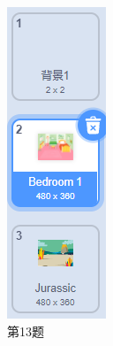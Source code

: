 \documentclass[10pt, a4paper]{article}
\begin{document}
\begin{enumerate}
\begin{figure}[htbp]
\begin{minipage}[t]{.09\textwidth}
                \includegraphics[width=.6\textwidth]{13.png}
                \caption*{第13题}
            \end{minipage}
            \begin{minipage}[t]{.23\textwidth}
                \centering

\end{minipage}
\end{figure}
\end{enumerate}
\end{document}
